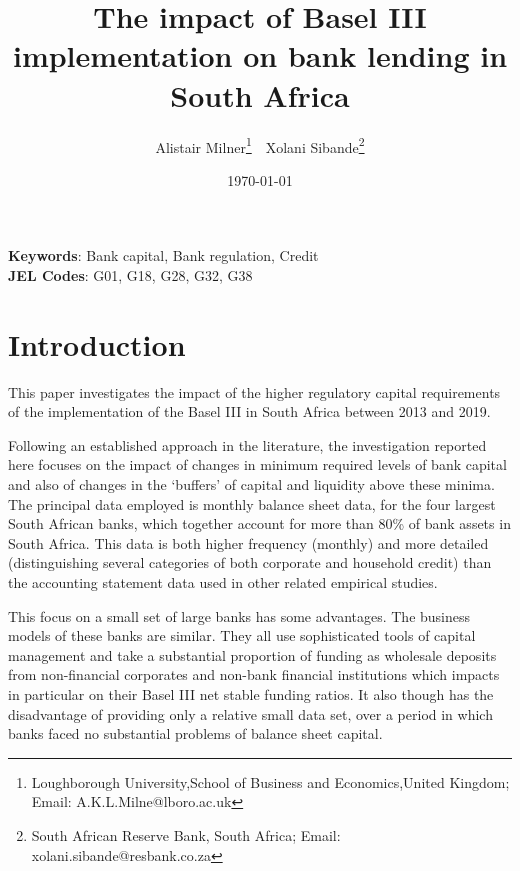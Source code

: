 \documentclass[
  12,
]{article}
\author{}
\date{\vspace{-2.5em}}
\begin{document}
\title{The impact of Basel III implementation on bank lending in South Africa}


\author { 
Alistair Milner\footnote{Loughborough University,School of Business and Economics,United Kingdom; Email: A.K.L.Milne@lboro.ac.uk}  \,\, 
Xolani Sibande\footnote{South African Reserve Bank, South Africa; Email: xolani.sibande@resbank.co.za}
}
\date{\today}
\maketitle

\begin{abstract}


\end{abstract}

\noindent\textbf{Keywords}: Bank capital, Bank regulation, Credit   \\
\textbf{JEL Codes}: G01, G18, G28, G32, G38
\newpage

\hypertarget{introduction}{%
\section{Introduction}\label{introduction}}

This paper investigates the impact of the higher regulatory capital requirements of the implementation of the Basel III in South Africa between 2013 and 2019.

Following an established approach in the literature, the investigation reported here focuses on the impact of changes in minimum required levels of bank capital and also of changes in the `buffers' of capital and liquidity above these minima. The principal data employed is monthly balance sheet data, for the four largest South African banks, which together account for more than 80\% of bank assets in South Africa. This data is both higher frequency (monthly) and more detailed (distinguishing several categories of both corporate and household credit) than the accounting statement data used in other related empirical studies.

This focus on a small set of large banks has some advantages. The business models of these banks are similar. They all use sophisticated tools of capital management and take a substantial proportion of funding as wholesale deposits from non-financial corporates and non-bank financial institutions which impacts in particular on their Basel III net stable funding ratios. It also though has the disadvantage of providing only a relative small data set, over a period in which banks faced no substantial problems of balance sheet capital.
\end{document}
